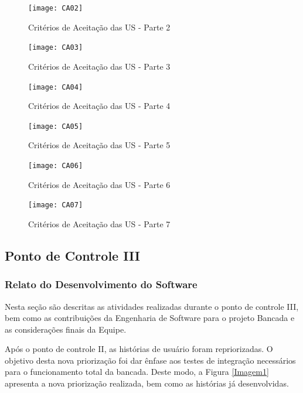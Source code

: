 		\begin{figure}[htpb]
			\centering
			\texttt{[image: CA02]}
			\caption{Critérios de Aceitação das US - Parte 2}
			\label{CA02}
		\end{figure}

		\begin{figure}[htpb]
			\centering
			\texttt{[image: CA03]}
			\caption{Critérios de Aceitação das US - Parte 3}
			\label{CA03}
		\end{figure}

		\begin{figure}[htpb]
			\centering
			\texttt{[image: CA04]}
			\caption{Critérios de Aceitação das US - Parte 4}
			\label{CA04}
		\end{figure}

		\begin{figure}[htpb]
			\centering
			\texttt{[image: CA05]}
			\caption{Critérios de Aceitação das US - Parte 5}
			\label{CA05}
		\end{figure}

		\begin{figure}[htpb]
			\centering
			\texttt{[image: CA06]}
			\caption{Critérios de Aceitação das US - Parte 6}
			\label{CA06}
		\end{figure}

		\begin{figure}[htpb]
			\centering
			\texttt{[image: CA07]}
			\caption{Critérios de Aceitação das US - Parte 7}
			\label{CA01}
		\end{figure}


\newpage
\subsection{Ponto de Controle III}
\subsubsection{Relato do Desenvolvimento do Software}
	
	Nesta seção são descritas as atividades realizadas durante o ponto de controle III, bem como as contribuições da Engenharia de Software para o projeto Bancada e as considerações finais da Equipe.


		Após o ponto de controle II, as histórias de usuário foram repriorizadas. O objetivo desta nova priorização foi dar ênfase aos testes de integração necessários para o funcionamento total da bancada. Deste modo, a Figura \ref{Imagem1} apresenta a nova priorização realizada, bem como as histórias já desenvolvidas.

